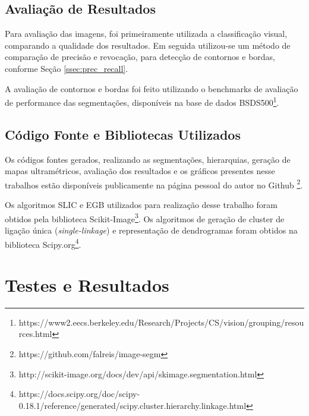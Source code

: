 \begin{document}

\subsection{Avaliação de Resultados} \label{ssec:aval_resultados}

Para avaliação das imagens, foi primeiramente utilizada a classificação visual, comparando a qualidade dos resultados. Em seguida utilizou-se um método de comparação de precisão e revocação, para detecção de contornos e bordas, conforme Seção \ref{ssec:prec_recall}. 

A avaliação de contornos e bordas foi feito utilizando o benchmarks de avaliação de performance das segmentações, disponíveis na base de dados BSDS500\footnote{https://www2.eecs.berkeley.edu/Research/Projects/CS/vision/grouping/resources.html}.



\subsection{Código Fonte e Bibliotecas Utilizados} \label{ssec:cod_fonte}

Os códigos fontes gerados, realizando as segmentações, hierarquias, geração de mapas ultramétricos, avaliação dos resultados e os gráficos presentes nesse trabalhos estão disponíveis publicamente na página pessoal do autor no Github \footnote{https://github.com/falreis/image-segm}.

Os algoritmos SLIC e EGB utilizados para realização desse trabalho foram obtidos pela biblioteca Scikit-Image\footnote{http://scikit-image.org/docs/dev/api/skimage.segmentation.html}. 
Os algoritmos de geração de cluster de ligação única (\textit{single-linkage}) e representação de dendrogramas foram obtidos na biblioteca Scipy.org\footnote{https://docs.scipy.org/doc/scipy-0.18.1/reference/generated/scipy.cluster.hierarchy.linkage.html}. 


\section{Testes e Resultados} \label{sec:testes}
\end{document}
